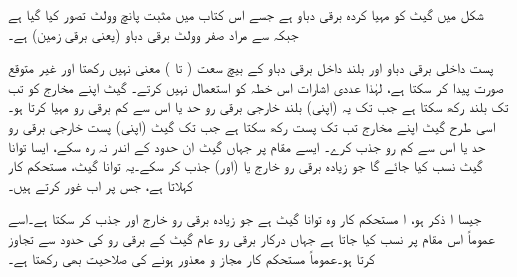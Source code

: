  شکل   میں   گیٹ کو مہیا کردہ برقی دباو ہے جسے اس کتاب میں مثبت پانچ وولٹ  تصور کیا گیا ہے جبکہ  سے مراد صفر وولٹ برقی دباو (یعنی برقی زمین)  ہے۔
 
  
پست  داخلی برقی دباو اور بلند  داخل برقی دباو کے بیچ سعت  ( تا )   معنی نہیں رکھتا اور  غیر متوقع صورت پیدا کر سکتا ہے، لہٰذا عددی  اشارات اس خطہ کو استعمال نہیں کرتے۔ 
 گیٹ  اپنے مخارج کو تب تک  بلند رکھ سکتا ہے جب تک یہ   (اپنی) بلند خارجی برقی رو حد  یا اس سے کم برقی رو مہیا کرتا ہو۔اسی طرح  گیٹ  اپنے مخارج تب  تک پست رکھ سکتا ہے جب تک  گیٹ (اپنی)  پست خارجی برقی رو حد یا اس سے کم  رو جذب کرے۔ ایسے مقام پر   جہاں گیٹ  ان حدود کے اندر نہ رہ سکے،    ایسا توانا گیٹ نسب کیا جائے گا جو زیادہ برقی رو خارج  یا (اور)  جذب کر سکے۔یہ  توانا گیٹ،  مستحکم کار کہلاتا ہے، جس پر اب غور کرتے ہیں۔
 	
جیسا ا ذکر ہو، ا مستحکم کار  وہ  توانا  گیٹ ہے جو زیادہ برقی رو خارج اور جذب کر سکتا ہے۔اسے عموماً اس مقام پر نسب کیا جاتا ہے جہاں درکار برقی رو  عام گیٹ کے برقی رو کی  حدود سے تجاوز کرتا ہو۔عموماً مستحکم کار مجاز و معذور ہونے کی صلاحیت بھی رکھتا ہے۔ 

